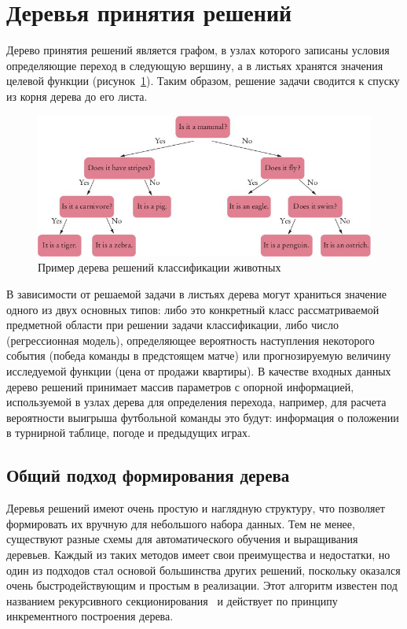 \documentclass[a4paper,14pt]{extarticle} %
\begin{document}
\section{Деревья принятия решений} 
\hspace{\parindent} Дерево принятия решений является графом, в узлах которого записаны условия определяющие переход в следующую вершину, а в листьях хранятся значения целевой функции (рисунок~\ref{fig:decision-tree}). Таким образом, решение задачи сводится к спуску из корня дерева до его листа.

\begin{figure}[H]
\centering
\includegraphics[width=0.8\linewidth]{decision-tree.jpg}
\caption{Пример дерева решений классификации животных}
\label{fig:decision-tree}
\end{figure}

В зависимости от решаемой задачи в листьях дерева могут храниться значение одного из двух основных типов: либо это конкретный класс рассматриваемой предметной области при решении задачи классификации, либо число (регрессионная модель), определяющее вероятность наступления некоторого события (победа команды в предстоящем матче) или прогнозируемую величину исследуемой функции (цена от продажи квартиры). В качестве входных данных дерево решений принимает массив параметров с опорной информацией, используемой в узлах дерева для определения перехода, например, для расчета вероятности выигрыша футбольной команды это будут: информация о положении в турнирной таблице, погоде и предыдущих играх.

\subsection{Общий подход формирования дерева}
\hspace{\parindent} Деревья решений имеют очень простую и наглядную структуру, что позволяет формировать их вручную для небольшого набора данных. Тем не менее, существуют разные схемы для автоматического обучения и выращивания деревьев. Каждый из таких методов имеет свои преимущества и недостатки, но один из подходов стал основой большинства других решений, поскольку оказался очень быстродействующим и простым в реализации. Этот алгоритм известен под названием рекурсивного секционирования~\cite{quinlan1990decision} и действует по принципу инкрементного построения дерева.
\end{document}
